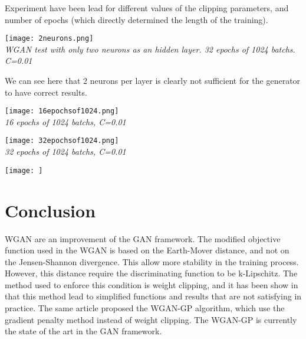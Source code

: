 \documentclass[a4paper]{article}
\theoremstyle{plain}
\theoremstyle{remark}
\theoremstyle{definition}
\begin{document}
Experiment have been lead for different values of the clipping parameters, and number of epochs (which directly determined the length of the training).

\begin{center}
	\texttt{[image: 2neurons.png]} \\
    \emph{WGAN test with only two neurons as an hidden layer. 32 epochs of 1024 batchs. C=0.01}
\end{center}
We can see here that 2 neurons per layer is clearly not sufficient for the generator to have correct results.

\begin{center}
	\texttt{[image: 16epochsof1024.png]} \\
    \emph{16 epochs of 1024 batchs, C=0.01}
\end{center}

\begin{center}
	\texttt{[image: 32epochsof1024.png]} \\
    \emph{32 epochs of 1024 batchs, C=0.01}
\end{center}

\begin{center}
	\texttt{[image: ]} \\
    \emph{}
\end{center}

\pagebreak
\section*{Conclusion}

WGAN are an improvement of the GAN framework. The modified objective function used in the WGAN is based on the Earth-Mover distance, and not on the Jensen-Shannon divergence. This allow more stability in the training process. However, this distance require the discriminating function to be k-Lipschitz. The method used to enforce this condition is weight clipping, and it has been show in \cite{gulrajani2017improved} that this method lead to simplified functions and results that are not satisfying in practice. The same article proposed the WGAN-GP algorithm, which use the gradient penalty method instead of weight clipping. The WGAN-GP is currently the state of the art in the GAN framework.

\nocite{*}


\end{document}
